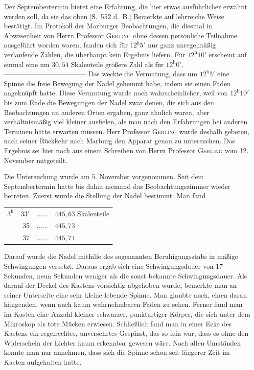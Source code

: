 Der Septembertermin bietet eine Erfahrung, die hier etwas ausführlicher erwähnt werden soll, da sie das oben [S.\ 552 d.\ B.] Bemerkte auf lehrreiche Weise bestätigt. Im Protokoll der Marburger Beobachtungen, die diesmal in Abwesenheit von Herrn Professor \textsc{Gerling} ohne dessen persönliche Teilnahme ausgeführt worden waren, fanden sich für $12^{\mathrm h}5'$ nur ganz unregelmäßig verlaufende Zahlen, die überhaupt kein Ergebnis liefern. Für $12^{\mathrm h}10'$ erscheint auf einmal eine um $30{,}54$ Skalenteile größere Zahl als für $12^{\mathrm h}0'$. ---\quad---\quad---\quad---\quad---\quad---\quad---\quad---\quad---\quad---\quad---\quad--- Das weckte die Vermutung, dass um $12^{\mathrm h}5'$ eine Spinne die freie Bewegung der Nadel gehemmt habe, indem sie einen Faden angeknüpft hatte. Diese Vermutung wurde noch wahrscheinlicher, weil von $12^{\mathrm h}10'$ bis zum Ende die Bewegungen der Nadel zwar denen, die sich aus den Beobachtungen an anderen Orten ergaben, ganz ähnlich waren, aber verhältnismäßig viel kleiner ausfielen, als man nach den Erfahrungen bei anderen Terminen hätte erwarten müssen. Herr Professor \textsc{Gerling} wurde deshalb gebeten, nach seiner Rückkehr nach Marburg den Apparat genau zu untersuchen. Das Ergebnis sei hier noch aus einem Schreiben von Herrn Professor \textsc{Gerling} vom 12. November mitgeteilt.

Die Untersuchung wurde am 5. November vorgenommen. Seit dem Septembertermin hatte bis dahin niemand das Beobachtungszimmer wieder betreten. Zuerst wurde die Stellung der Nadel bestimmt. Man fand
\begin{center}
\begin{tabular}{rrc l}
$3^{\mathrm h}$&$33'$&.\quad.\quad.\quad.\quad.\quad.&$445{,}63$ Skalenteile\\
&35&.\quad.\quad.\quad.\quad.\quad.&$445{,}73$\\
&37&.\quad.\quad.\quad.\quad.\quad.&$445{,}71$
\end{tabular}
\end{center}

Darauf wurde die Nadel mithilfe des sogenannten Beruhigungsstabs in mäßige Schwingungen versetzt. Daraus ergab sich eine Schwingungsdauer von 17 Sekunden, neun Sekunden weniger als die sonst bekannte Schwingungsdauer. Als darauf der Deckel des Kastens vorsichtig abgehoben wurde, bemerkte man an seiner Unterseite eine sehr kleine lebende Spinne. Man glaubte auch, einen daran hängenden, wenn auch kaum wahrnehmbaren Faden zu sehen. Ferner fand man im Kasten eine Anzahl kleiner schwarzer, punktartiger Körper, die sich unter dem Mikroskop als tote Mücken erwiesen. Schließlich fand man in einer Ecke des Kastens ein regelrechtes, unversehrtes Gespinst, das so fein war, dass es ohne den Widerschein der Lichter kaum erkennbar gewesen wäre. Nach allen Umständen konnte man nur annehmen, dass sich die Spinne schon seit längerer Zeit im Kasten aufgehalten hatte.

